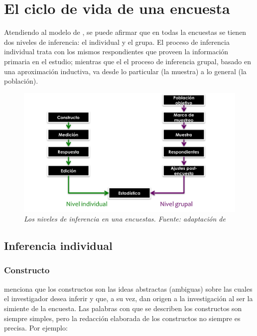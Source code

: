 \documentclass[
  12pt,
  spanish,
]{book}
\begin{document}
\hypertarget{el-ciclo-de-vida-de-una-encuesta}{%
\section{El ciclo de vida de una encuesta}\label{el-ciclo-de-vida-de-una-encuesta}}

Atendiendo al modelo de \citet{Groves_Fowler_Couper_Lepkowski_Singer_Tourangeau_2009}, se puede afirmar que en todas la encuestas se tienen dos niveles de inferencia: el individual y el grupa. El proceso de inferencia individual trata con los mismos respondientes que proveen la información primaria en el estudio; mientras que el el proceso de inferencia grupal, basado en una aproximación inductiva, va desde lo particular (la muestra) a lo general (la población).

\begin{figure}
\centering
\includegraphics{Pics/Picture6.png}
\caption{\emph{Los niveles de inferencia en una encuestas. Fuente: adaptación de \citet{Groves_Fowler_Couper_Lepkowski_Singer_Tourangeau_2009}}}
\end{figure}

\hypertarget{inferencia-individual}{%
\subsection{Inferencia individual}\label{inferencia-individual}}

\hypertarget{constructo}{%
\subsubsection{Constructo}\label{constructo}}

\citet{Gutierrez_2016} menciona que los constructos son las ideas abstractas (ambiguas) sobre las cuales el investigador desea inferir y que, a su vez, dan origen a la investigación al ser la simiente de la encuesta. Las palabras con que se describen los constructos son siempre simples, pero la redacción elaborada de los constructos no siempre es precisa. Por ejemplo:
\end{document}
